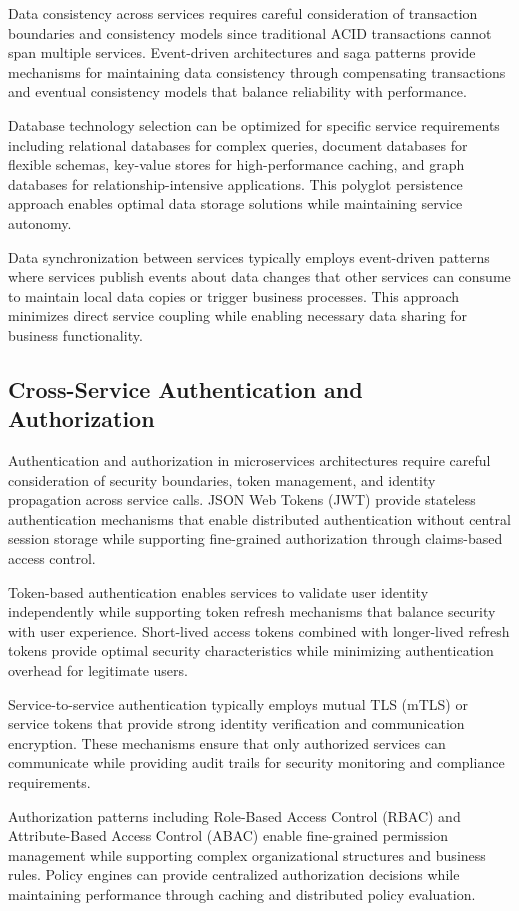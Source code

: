 Data consistency across services requires careful consideration of transaction boundaries and consistency models since traditional ACID transactions cannot span multiple services. Event-driven architectures and saga patterns provide mechanisms for maintaining data consistency through compensating transactions and eventual consistency models that balance reliability with performance.

Database technology selection can be optimized for specific service requirements including relational databases for complex queries, document databases for flexible schemas, key-value stores for high-performance caching, and graph databases for relationship-intensive applications. This polyglot persistence approach enables optimal data storage solutions while maintaining service autonomy.

Data synchronization between services typically employs event-driven patterns where services publish events about data changes that other services can consume to maintain local data copies or trigger business processes. This approach minimizes direct service coupling while enabling necessary data sharing for business functionality.

\subsection{Cross-Service Authentication and Authorization}

Authentication and authorization in microservices architectures require careful consideration of security boundaries, token management, and identity propagation across service calls. JSON Web Tokens (JWT) provide stateless authentication mechanisms that enable distributed authentication without central session storage while supporting fine-grained authorization through claims-based access control.

Token-based authentication enables services to validate user identity independently while supporting token refresh mechanisms that balance security with user experience. Short-lived access tokens combined with longer-lived refresh tokens provide optimal security characteristics while minimizing authentication overhead for legitimate users.

Service-to-service authentication typically employs mutual TLS (mTLS) or service tokens that provide strong identity verification and communication encryption. These mechanisms ensure that only authorized services can communicate while providing audit trails for security monitoring and compliance requirements.

Authorization patterns including Role-Based Access Control (RBAC) and Attribute-Based Access Control (ABAC) enable fine-grained permission management while supporting complex organizational structures and business rules. Policy engines can provide centralized authorization decisions while maintaining performance through caching and distributed policy evaluation.